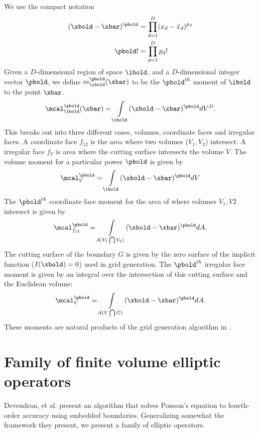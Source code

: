 \documentclass{article}
\begin{document}
We use the compact notation
\begin{align*}
(\xbold - \xbar)^\pbold &= \prod\limits^D_{d=1} (x_d - {\bar x}_d)^{p_d} \\
\pbold! &= \prod\limits^D_{d = 1} p_d!
\end{align*}
Given a $D$-dimensional region of space $\ibold$, 
and a $D$-dimensional integer vector
$\pbold$, we define $m_\ibold^\pbold(\xbar)$ to be the $\pbold^{th}$
moment of $\ibold$ to the point $\xbar$.
\begin{equation}
\mcal_\ibold^\pbold(\xbar)  =  \int\limits_{\ibold} (\xbold - \xbar)^\pbold dV^D.
\label{eqn::volmoment}
\end{equation}
This breaks out into three different cases, volumes, coordinate faces
and irregular faces.
A coordinate face $f_{12}$  is the area where two
volumes ($V_1, V_2$) intersect.
A irregular face $f_V$  is area where the cutting surface
intersects the volume $V$.
The volume moment for a particular power $\pbold$  is
given by
\begin{equation}
  \mcal^\pbold_V = \int\limits_{\ibold} (\xbold - \xbar)^\pbold dV
  \label{eqn::volmom}
\end{equation}
The $\pbold^{th}$ coordinate face moment for the area of where volumes $V_1, V2$
intersect is given by
\begin{equation}
  \mcal^\pbold_{f_{12}} = \int\limits_{A(V_1\bigcap V_2)} (\xbold - \xbar)^\pbold dA.
  \label{eqn::facmom}
\end{equation}
The cutting surface of the boundary $G$ is given by  the zero
surface of the  implicit function ($I(\xbold)= 0$) used in grid generation.
The $\pbold^{th}$ irregular face moment is given by an integral over
the intersection of this cutting surface and the Euclidean volume:
\begin{equation}
  \mcal^\pbold_V = \int\limits_{A(V \bigcap G)} (\xbold - \xbar)^\pbold dA.
  \label{eqn::irrmom}
\end{equation}
These moments are natural products of the grid generation algorithm
in \cite{Schwartz2015}.


\section{Family of finite volume elliptic operators}

Devendran, et al. \cite{Devendran2017} present an algorithm that
solves Poisson's equation to fourth-order accuracy using embedded
boundaries.  Generalizing somewhat  the framework they present, we
present a family of elliptic operators.
\end{document}
